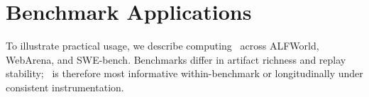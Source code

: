 \section{Benchmark Applications}
To illustrate practical usage, we describe computing \RSS\ across ALFWorld, WebArena, and SWE-bench. Benchmarks differ in artifact richness and replay stability; \RSS\ is therefore most informative within-benchmark or longitudinally under consistent instrumentation.
